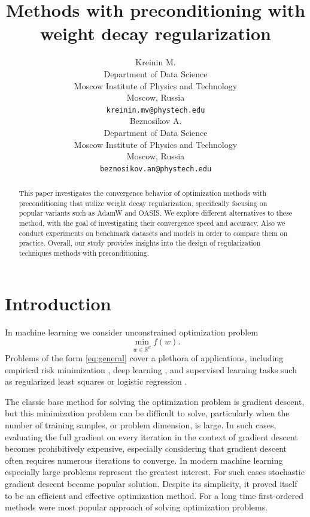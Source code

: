 \documentclass{article}
\title{Methods with preconditioning with weight decay regularization}
\author{Kreinin M. \\
	Department of Data Science\\
	Moscow Institute of Physics and Technology\\
	Moscow, Russia \\
	\texttt{kreinin.mv@phystech.edu} \\
	\And
        Beznosikov A. \\
	Department of Data Science\\
	Moscow Institute of Physics and Technology\\
	Moscow, Russia \\
	\texttt{beznosikov.an@phystech.edu} \\
}
\begin{document}
\maketitle

\begin{abstract}
This paper investigates the convergence behavior of optimization methods with preconditioning that utilize weight decay regularization, specifically focusing on popular variants such as AdamW and OASIS.
We explore different alternatives to these method, with the goal of investigating their convergence speed and accuracy.
Also we conduct experiments on benchmark datasets and models in order to compare them on practice.
Overall, our study provides insights into the design of regularization techniques methods with preconditioning.
\end{abstract}


\section{Introduction}

In machine learning we consider unconstrained optimization problem
\begin{equation}
    \label{eq:general}
	\min_{w \in \mathbb{R}^d} f(w).
\end{equation}
Problems of the form \eqref{eq:general} cover a plethora of applications, including empirical risk minimization \citep{chapelle2000vicinal},
deep learning \citep{lecun2015deep}, and supervised learning \citep{cunningham2008supervised} tasks such as regularized least squares \citep{rifkin2007notes} or logistic regression \citep{shalev2014understanding}.

The classic base method for solving the optimization problem is gradient descent, but this minimization problem can be difficult to solve, particularly when the number of training samples, or problem dimension, is large.
In such cases, evaluating the full gradient on every iteration in the context of gradient descent becomes prohibitively expensive, especially considering that gradient descent often requires numerous iterations to converge.
In modern machine learning especially large problems represent the greatest interest.
For such cases stochastic gradient descent \citep{robbins1951stochastic} became popular solution.
Despite its simplicity, it proved itself to be an efficient and effective optimization method.
For a long time first-ordered methods were most popular approach of solving optimization problems.
\end{document}
